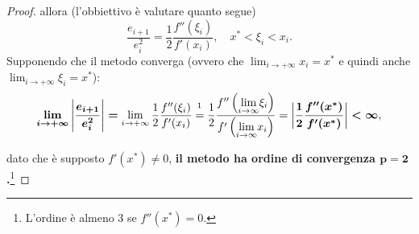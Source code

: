 \begin{proof}
	\noindent allora (l'obbiettivo è valutare quanto segue)
	\begin{equation*}
		\frac{e_{i+1}}{e_i^2} = \frac{1}{2}\frac{f''(\xi_i)}{f'(x_i)}, \quad x^*<\xi_i<x_i.
	\end{equation*}
	Supponendo che il metodo converga (ovvero che $\lim_{i\rightarrow+\infty}x_i=x^*$ e quindi anche $\lim_{i\rightarrow+\infty}\xi_i=x^*$): 
	\begin{equation*}
		\boldsymbol{\lim_{i\to + \infty}\left|{\frac{e_{i+1}}{e_i^2}}\right|=}\lim_{i\to + \infty}{\frac{1}{2}\frac{f''(\xi_i)}{f'(x_i)}}\overset{\footnotemark}{=}\frac{1}{2}\frac{f''\left(\underset{i\to\infty}{\lim}\xi_i\right)}{f'\left(\underset{i\to\infty}{\lim}{x_i}\right)}=\boldsymbol{\left|\frac{1}{2}\frac{f''(x^*)}{f'(x^*)}\right|<\infty},
	\end{equation*}
	
	
	\noindent dato che è supposto $f'(x^*)\neq0$, \textbf{il metodo ha ordine di convergenza $\boldsymbol{p=2}$.}\footnote{L'ordine è almeno 3 se $f''(x^*)=0$.}
\end{proof}


